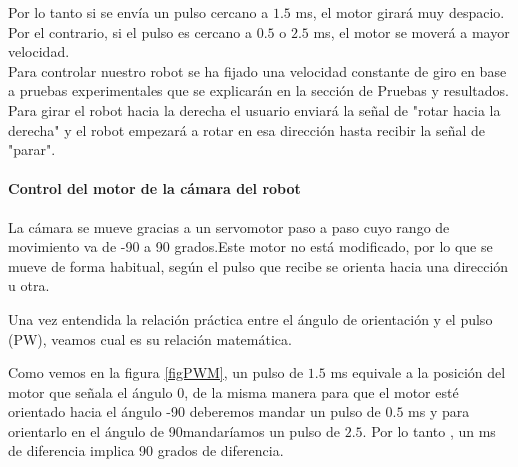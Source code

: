 \documentclass[twoside, 11pt]{epstfg}
\begin{document}
Por lo tanto si se envía un pulso cercano a $1.5$ ms, el motor girará muy despacio. Por el contrario, si el pulso es cercano a $0.5$ o $2.5$ ms, el motor se moverá a mayor velocidad.\\
Para controlar nuestro robot se ha fijado una velocidad constante de giro en base a pruebas experimentales que se explicarán en la sección de Pruebas y resultados.\\
Para girar el robot hacia la derecha el usuario enviará la señal de "rotar hacia la derecha" y el robot empezará a rotar en esa dirección hasta recibir la señal de "parar".

%
%
%



\paragraph{Control del motor de la cámara del robot}

La cámara se mueve gracias a un servomotor paso a paso cuyo rango de movimiento va de -90 a 90 grados.Este motor no está modificado, por lo que se mueve de forma habitual, según el pulso que recibe se orienta hacia una dirección u otra.

Una vez entendida la relación práctica entre el ángulo de orientación y el pulso (PW), veamos cual es su relación matemática.

Como vemos en la figura \ref{figPWM}, un pulso de $1.5$ ms equivale a la posición del motor que señala el ángulo 0, de la misma manera para que el motor esté orientado hacia el ángulo -90 deberemos mandar un pulso de $0.5$ ms y para orientarlo en el ángulo de 90mandaríamos un pulso de $2.5$. Por lo tanto , un ms de diferencia implica 90 grados de diferencia.
\end{document}
